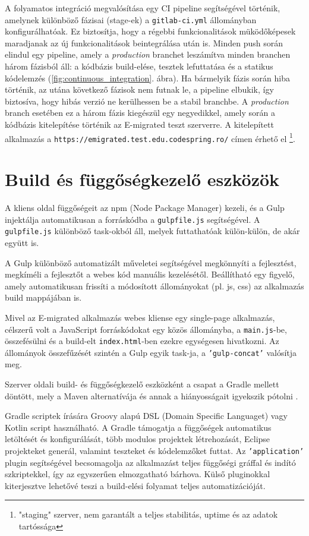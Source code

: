 A folyamatos integráció megvalósítása egy CI pipeline segítségével történik, amelynek különböző fázisai (stage-ek) a \texttt{gitlab-ci.yml} állományban  konfigurálhatóak. Ez biztosítja, hogy a régebbi funkcionalitások müködőképesek maradjanak az új funkcionalitások beintegrálása után is. Minden push során elindul egy pipeline, amely a \textit{production} branchet leszámítva minden branchen három fázisból áll: a kódbázis build-elése, tesztek lefuttatása és a statikus kódelemzés (\ref{fig:continuous_integration}. ábra). Ha bármelyik fázis során hiba történik, az utána következő fázisok nem futnak le, a pipeline elbukik, így biztosíva, hogy hibás verzió ne kerülhessen be a stabil branchbe. A \textit{production} branch esetében ez a három fázis kiegészül egy negyedikkel, amely során a kódbázis kitelepítése történik az E-migrated teszt szerverre. A kitelepített alkalmazás a \texttt{https://emigrated.test.edu.codespring.ro/} címen érhető el \footnote{"staging" szerver, nem garantált a teljes stabilitás, uptime és az adatok tartóssága}. 




\section{Build és függőségkezelő eszközök}
\label{subsec:gradle}
A kliens oldal függőségeit az npm (Node Package Manager) \cite{npm} kezeli, és a Gulp \cite{gulp} injektálja automatikusan a forráskódba a \texttt{gulpfile.js} segítségével. A \texttt{gulpfile.js} különböző task-okból áll, melyek futtathatóak külön-külön, de akár együtt is. 

A Gulp különböző automatizált műveletei segítségével megkönnyíti a fejlesztést, megkíméli a fejlesztőt a webes kód manuális kezelésétől. Beállítható egy figyelő, amely automatikusan frissíti a módosított állományokat (pl. js, css) az alkalmazás build mappájában is. 

Mivel az E-migrated alkalmazás webes kliense egy single-page alkalmazás, célszerű volt a JavaScript forráskódokat egy közös állományba, a \texttt{main.js}-be, összefésülni és a build-elt \texttt{index.html}-ben ezekre egységesen hivatkozni. Az állományok összefűzését szintén a Gulp egyik task-ja, a \texttt{'gulp-concat'} valósítja meg.  

Szerver oldali build- és függőségkezelő eszközként a csapat a Gradle mellett döntött, mely a Maven alternatívája és annak a hiányosságait igyekszik pótolni \cite{Gradle,GradleDoc}. 

Gradle scriptek írására Groovy alapú DSL (Domain Specific Languaget) vagy Kotlin script használható.  A Gradle támogatja a függőségek automatikus letöltését és konfigurálását, több modulos projektek létrehozását, Eclipse projekteket generál, valamint teszteket és kódelemzőket futtat. Az \texttt{'application'} plugin segítségével becsomagolja az alkalmazást teljes függőségi gráffal és indító szkriptekkel, így az egyszerűen elmozgatható bárhova. Külső pluginokkal kiterjesztve lehetővé teszi a build-elési folyamat teljes automatizációját. 


